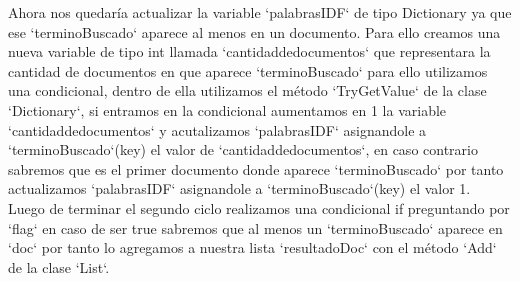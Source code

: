 \documentclass{article}
\begin{document}
Ahora nos quedaría actualizar la variable `palabrasIDF` de tipo Dictionary ya que ese `terminoBuscado`
aparece al menos en un documento. Para ello creamos una nueva variable de tipo int llamada 
`cantidaddedocumentos` que representara la cantidad de documentos en que aparece `terminoBuscado` 
para ello utilizamos una condicional, dentro de ella utilizamos el método `TryGetValue` de la clase
`Dictionary`, si entramos en la condicional aumentamos en 1 la variable `cantidaddedocumentos` y
acutalizamos `palabrasIDF` asignandole a `terminoBuscado`(key) el valor de `cantidaddedocumentos`,
en caso contrario sabremos que es el primer documento donde aparece `terminoBuscado` por tanto 
actualizamos `palabrasIDF` asignandole a `terminoBuscado`(key) el valor 1.\\

Luego de terminar el segundo ciclo realizamos una condicional if preguntando por
`flag` en caso de ser true sabremos que al menos un `terminoBuscado` aparece en `doc`
por tanto lo agregamos a nuestra lista `resultadoDoc` con el método `Add` de la clase `List`.\\
\end{document}
